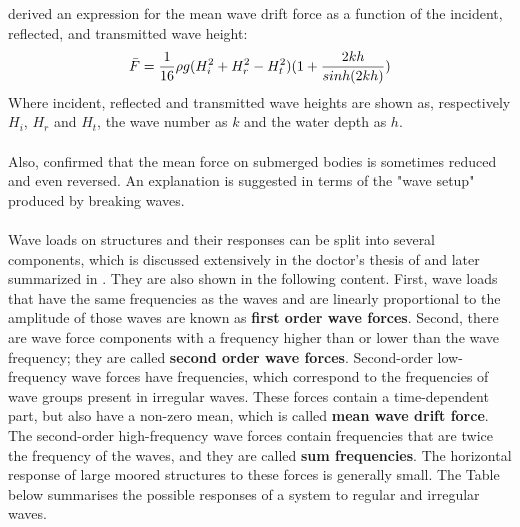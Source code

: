 \parencite{longuethiggins1977} derived an expression for the mean wave drift force as a function of the incident, reflected, and transmitted wave height:
\begin{equation}
    \Bar{F} = \frac{1}{16}\rho g (H_i^2 + H_r^2 - H_t^2)(1 + \frac{2kh}{sinh(2kh)})
    \label{eq: longuethiggins force}
\end{equation}
Where incident, reflected and transmitted wave heights are shown as, respectively $H_i$, $H_r$ and $H_t$, the wave number as $k$ and the water depth as $h$.\\
\\
Also, \parencite{longuethiggins1977} confirmed that the mean force on submerged bodies is sometimes reduced and even reversed. An explanation is suggested in terms of the "wave setup" produced by breaking waves.\\
\\

Wave loads on structures and their responses can be split into several components, which is discussed extensively in the doctor's thesis of \parencite{Pinkster1980} and later summarized in \parencite{journee2000offshore}. They are also shown in the following content.
First, wave loads that have the same frequencies as the waves and are linearly proportional to the amplitude of those waves are known as \textbf{first order wave forces}. Second, there are wave force components with a frequency higher than or lower than the wave frequency; they are called \textbf{second order wave forces}. 
Second-order low-frequency wave forces have frequencies, which correspond to the frequencies of wave groups present in irregular waves. These forces contain a time-dependent part, but also have a non-zero mean, which is called \textbf{mean wave drift force}.
The second-order high-frequency wave forces contain frequencies that are twice the frequency of the waves, and they are called \textbf{sum frequencies}. The horizontal response of large moored structures to these forces is generally small. The Table below summarises the possible responses of a system to regular and irregular waves. 


